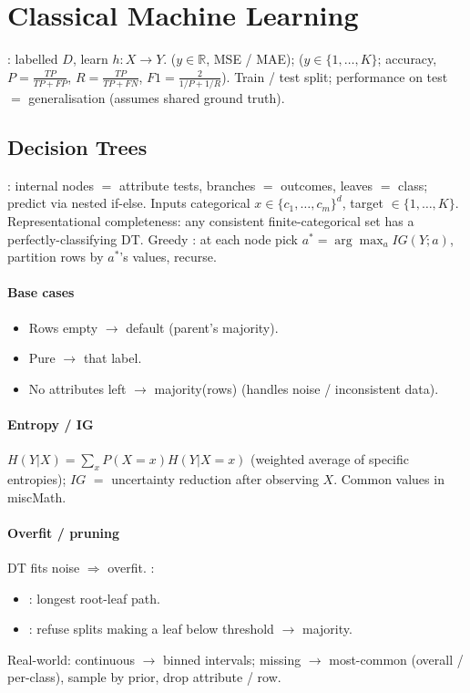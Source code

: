 \section{Classical Machine Learning}
: labelled $D$, learn $h:X\!\to\!Y$.  ($y\!\in\!\mathbb{R}$, MSE / MAE);  ($y\!\in\!\{1,\dots,K\}$; accuracy, $P{=}\tfrac{TP}{TP+FP}$, $R{=}\tfrac{TP}{TP+FN}$, $F1{=}\tfrac{2}{1/P+1/R}$). Train / test split; performance on test $=$ generalisation (assumes shared ground truth).

\subsection{Decision Trees}
: internal nodes $=$ attribute tests, branches $=$ outcomes, leaves $=$ class; predict via nested if-else. Inputs categorical $x\!\in\!\{c_1,\dots,c_m\}^d$, target $\!\in\!\{1,\dots,K\}$. Representational completeness: any consistent finite-categorical set has a perfectly-classifying DT.  Greedy : at each node pick $a^{*}{=}\arg\max_a IG(Y;a)$, partition rows by $a^{*}$'s values, recurse.
\paragraph{Base cases}
\begin{itemize}
\item Rows empty $\to$ default (parent's majority).
\item Pure $\to$ that label.
\item No attributes left $\to$ majority(rows) (handles noise / inconsistent data).
\end{itemize}
\paragraph{Entropy / IG} $H(Y|X){=}\sum_x P(X{=}x)H(Y|X{=}x)$ (weighted average of specific entropies); $IG$ $=$ uncertainty reduction after observing $X$. Common values in miscMath.
\paragraph{Overfit / pruning} DT fits noise $\Rightarrow$ overfit. :
\begin{itemize}
\item {}: longest root-leaf path.
\item {}: refuse splits making a leaf below threshold $\to$ majority.
\end{itemize}
Real-world: continuous $\to$ binned intervals; missing $\to$ most-common (overall / per-class), sample by prior, drop attribute / row.

